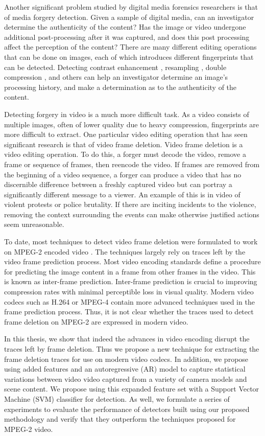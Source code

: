 Another significant problem studied by digital media forensics researchers is that of media forgery detection. Given a sample of digital media, can an investigator determine the authenticity of the content? Has the image or video undergone additional post-processing after it was captured, and does this post processing affect the perception of the content? There are many different editing operations that can be done on images, each of which introduces different fingerprints that can be detected. Detecting contrast enhancement \cite{contrastenhance}, resampling \cite{resampling}, double compression \cite{doubleJPEG}, and others \cite{lca} can help an investigator determine an image's processing history, and make a determination as to the authenticity of the content.

Detecting forgery in video is a much more difficult task. As a video consists of multiple images, often of lower quality due to heavy compression, fingerprints are more difficult to extract. One particular video editing operation that has seen significant research is that of video frame deletion. Video frame deletion is a video editing operation. To do this, a forger must decode the video, remove a frame or sequence of frames, then reencode the video. If frames are removed from the beginning of a video sequence, a forger can produce a video that has no discernible difference between a freshly captured video but can portray a significantly different message to a viewer. An example of this is in video of violent protests or police brutality. If there are inciting incidents to the violence, removing the context surrounding the events can make otherwise justified actions seem unreasonable.

To date, most techniques to detect video frame deletion were formulated to work on MPEG-2 encoded video\cite{wang} \cite{stamm}. The techniques largely rely on traces left by the video frame prediction process. Most video encoding standards define a procedure for predicting the image content in a frame from other frames in the video. This is known as inter-frame prediction. Inter-frame prediction is crucial to improving compression rates with minimal perceptible loss in visual quality. Modern video codecs such as H.264 or MPEG-4 contain more advanced techniques used in the frame prediction process. Thus, it is not clear whether the traces used to detect frame deletion on MPEG-2 are expressed in modern video. 

In this thesis, we show that indeed the advances in video encoding disrupt the traces left by frame deletion. Thus we propose a new technique for extracting the frame deletion traces for use on modern video codecs. In addition, we propose using added features and an autoregressive (AR) model to capture statistical variations between video video captured from a variety of camera models and scene content. We propose using this expanded feature set with a Support Vector Machine (SVM) classifier for detection. As well, we formulate a series of experiments to evaluate the performance of detectors built using our proposed methodology and verify that they outperform the techniques proposed for MPEG-2 video.

